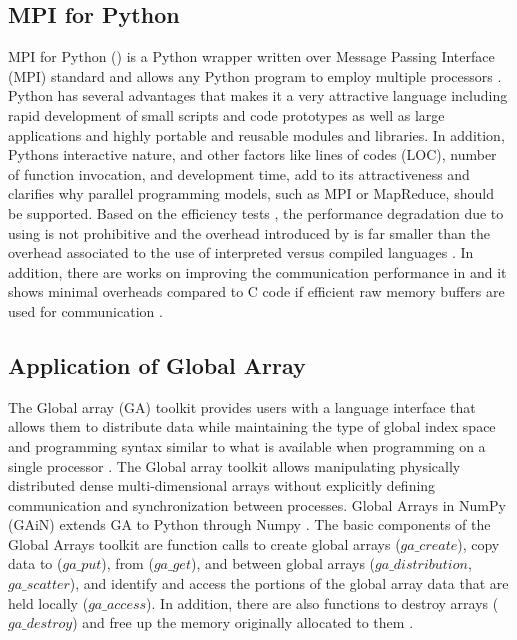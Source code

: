 \subsection{MPI for Python }
MPI for Python () is a Python wrapper written over Message Passing Interface (MPI) standard and allows any Python program to employ multiple processors \cite{Dalcin:2011aa, Dalcin:2005aa}.
Python has several advantages that makes it a very attractive language including rapid development of small scripts and code prototypes as well as large applications and highly portable and reusable modules and libraries.
In addition, Python\textsc{}s interactive nature, and other factors like lines of codes (LOC), number of function invocation, and development time, add to its attractiveness and clarifies why parallel programming models, such as MPI or MapReduce, should be supported.
Based on the efficiency tests \cite{Dalcin:2011aa, Dalcin:2005aa}, the performance degradation due to using  is not prohibitive and the overhead introduced by  is far smaller than the overhead associated to the use of interpreted versus compiled languages \cite{GAiN}.
In addition, there are works on improving the communication performance in  and it shows minimal overheads compared to C code if efficient raw memory buffers are used for communication \cite{Dalcin:2011aa}.

\subsection{Application of Global Array}
The Global array (GA) toolkit provides users with a language interface that allows them to distribute data while maintaining the type of global index space and programming syntax similar to what is available when programming on a single processor \cite{GA}. The Global array toolkit allows manipulating physically distributed dense multi-dimensional arrays without explicitly defining communication and synchronization between processes.
Global Arrays in NumPy (GAiN) extends GA to Python through Numpy \cite{GAiN}. 
The basic components of the Global Arrays toolkit are function calls to create global arrays ($ga\_create$), copy data to ($ga\_put$), from ($ga\_get$), and between global arrays ($ga\_distribution$, $ga\_scatter$), and identify and access the portions of the global array data that are held locally ($ga\_access$). 
In addition, there are also functions to destroy arrays ($ga\_destroy$) and free up the memory originally allocated to them \cite{GAiN}.

